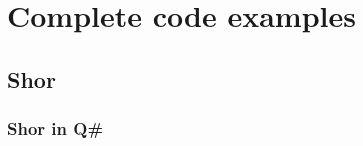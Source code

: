 \chapter{Complete code examples}
\label{FullCode}



\section*{Shor}

\newpage
\subsection{Shor in Q\#}



